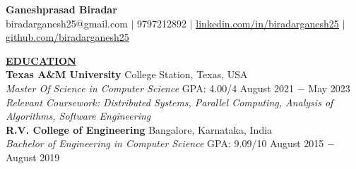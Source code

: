\documentclass{article}
\begin{document}
\begin{center}
\large \textbf{Ganeshprasad Biradar \\}
\normalsize biradarganesh25@gmail.com $\mid$ 9797212892 $\mid$ \href{https://www.linkedin.com/in/biradarganesh25}{\underline{linkedin.com/in/biradarganesh25}} $\mid$ \href{https://github.com/biradarganesh25}{\underline{github.com/biradarganesh25}} \\
\hrulefill
\end{center}





\noindent \textbf{\underline{EDUCATION}} \\
\textbf{Texas A\&M University} \hfill College Station, Texas, USA \\
\textit{Master Of Science in Computer Science}  \tabto*{9cm} GPA: 4.00/4 \hfill August 2021 $-$ May 2023 \\
\textit{Relevant Coursework: Distributed Systems, Parallel Computing, Analysis of Algorithms, Software Engineering}\\

\noindent \textbf{R.V. College of Engineering} \hfill Bangalore, Karnataka, India \\
\textit{Bachelor of Engineering in Computer Science} \tabto*{9cm} GPA: 9.09/10 \hfill August 2015 $-$ August 2019 \\
\end{document}
